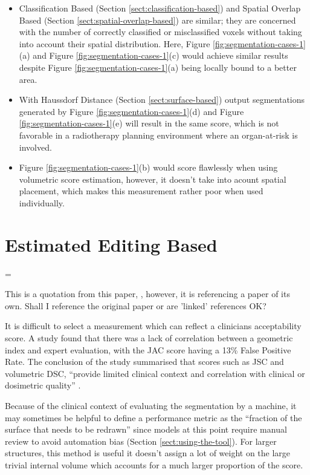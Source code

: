 \documentclass[11pt,twoside]{report}
\newenvironment{warning}
  {\par\begin{mdframed}[linewidth=1pt,linecolor=black]%
    \begin{list}{}{\leftmargin=1cm
                   \labelwidth=\leftmargin}\item[\Large\ding{43}]}
  {\end{list}\end{mdframed}\par}
\begin{document}
\begin{itemize}
  \item Classification Based (Section \ref{sect:classification-based}) and Spatial Overlap Based (Section \ref{sect:spatial-overlap-based}) are similar; they are concerned with the number of correctly classified or misclassified voxels without taking into account their spatial distribution. Here, Figure \ref{fig:segmentation-cases-1}(a) and Figure \ref{fig:segmentation-cases-1}(c) would achieve similar results despite Figure \ref{fig:segmentation-cases-1}(a) being locally bound to a better area.
  \item With Haussdorf Distance (Section \ref{sect:surface-based}) output segmentations generated by Figure \ref{fig:segmentation-cases-1}(d) and Figure \ref{fig:segmentation-cases-1}(e) will result in the same score, which is not favorable in a radiotherapy planning environment where an organ-at-risk is involved.
  \item Figure \ref{fig:segmentation-cases-1}(b) would score flawlessly when using volumetric score estimation, however, it doesn't take into acount spatial placement, which makes this measurement rather poor when used individually.
\end{itemize}

\section{Estimated Editing Based}\label{sect:surface-dice}

\begin{warning}
  This is a quotation from this paper, \cite{Sherer2021-le}, however, it is referencing a paper of its own. Shall I reference the original paper or are 'linked' references OK?
\end{warning}

It is difficult to select a measurement which can reflect a clinicians acceptability score. A study found that there was a lack of correlation between a geometric index and expert evaluation, with the JAC score having a 13\% False Positive Rate. The conclusion of the study summarised that scores such as JSC and volumetric DSC, ``provide limited clinical context and correlation with clinical or dosimetric quality'' \cite{Sherer2021-le}.

Because of the clinical context of evaluating the segmentation by a machine, it may sometimes be helpful to define a performance metric as the ``fraction of the surface that needs to be redrawn'' \cite{Nikolov2021-xe} since models at this point require manual review to avoid automation bias (Section \ref{sect:using-the-tool}). For larger structures, this method is useful it doesn't assign a lot of weight on the large trivial internal volume which accounts for a much larger proportion of the score.
\end{document}
